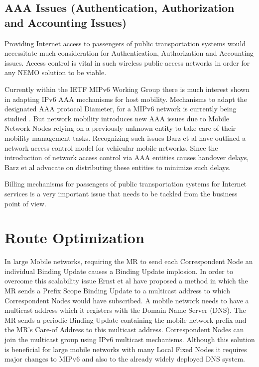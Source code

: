 \subsection{AAA Issues (Authentication, Authorization and Accounting Issues)}

Providing Internet access to passengers of public transportation systems would
necessitate much consideration for Authentication, Authorization and
Accounting issues. Access control is vital in such wireless public access
networks in order for any NEMO solution to be viable.

Currently within the IETF MIPv6 Working Group there is much interest shown in
adapting IPv6 AAA mechanisms for host mobility. Mechanisms to adapt the
designated AAA protocol Diameter, for a MIPv6 network is currently being
studied \cite{22}. But network mobility introduces new AAA issues due to
Mobile Network Nodes relying on a previously unknown entity to take care of
their mobility management tasks. Recognizing such issues Barz et al \cite{23}
have outlined a network access control model for vehicular mobile networks.
Since the introduction of network access control via AAA entities causes
handover delays, Barz et al \cite{23} advocate on distributing these entities
to minimize such delays.

Billing mechanisms for passengers of public transportation systems for Internet
services is a very important issue that needs to be tackled from the business
point of view.

\section{Route Optimization}

In large Mobile networks, requiring the MR to send each Correspondent Node an
individual Binding Update causes a Binding Update implosion. In order to
overcome this scalability issue Ernst et al \cite{24} have proposed a method
in which the MR sends a Prefix Scope Binding Update to a multicast address to
which Correspondent Nodes would have subscribed. A mobile network needs to
have a multicast address which it registers with the Domain Name Server (DNS).
The MR sends a periodic Binding Update containing the mobile network prefix
and the MR's Care-of Address to this multicast address. Correspondent Nodes
can join the multicast group using IPv6 multicast mechanisms. Although this
solution is beneficial for large mobile networks with many Local Fixed Nodes
it requires major changes to MIPv6 and also to the already widely deployed DNS system.

